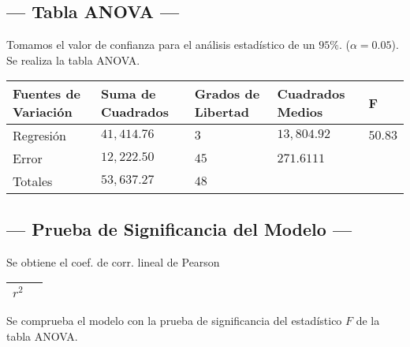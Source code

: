 \subsection{--- Tabla ANOVA ---} %
Tomamos el valor de confianza para el análisis estadístico de un \(95\%\). (\(\alpha =0.05\)). \\ 
Se realiza la tabla ANOVA.
\begin{center}
  \begin{tabular}{|p{2cm}|p{2cm}|p{2cm}|p{2cm}|l|}
    \hline 
    Fuentes de Variación  & Suma de Cuadrados & Grados de Libertad & Cuadrados Medios & F\\ \hline 
    Regresión           & \(41,414.76\) &           \(3\) &        \(13,804.92\) & \(50.83\) \\ \hline 
    Error               & \(12,222.50\) &          \(45\) &          \(271.6111\) &   \\ \hline 
    Totales             & \(53,637.27\) &          \(48\) &         &   \\ \hline 
  \end{tabular}
\end{center} 

\subsection{--- Prueba de Significancia del Modelo ---} %

Se obtiene el coef. de corr. lineal de Pearson

\begin{table}[hbtp!]
	\centering
	\begin{tabular}{|p{2cm}|p{2cm}|}
		\hline 
		\(r ^ 2\) &  \\ \hline 
	\end{tabular}
\end{table}

Se comprueba el modelo con la prueba de significancia del estadístico \(F\) de la tabla ANOVA.

